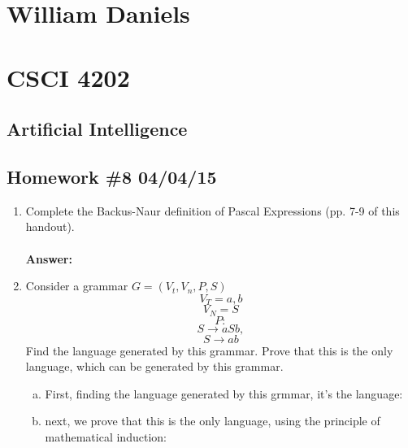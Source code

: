 \documentclass[11pt]{article}
\begin{document}
\begin{center}
\section*{William Daniels}
\section*{CSCI 4202}
\subsection*{Artificial Intelligence}
\subsection*{Homework \#8 04/04/15}
\end{center}

\vspace{.25cm}

\begin{enumerate}
\item Complete the Backus-Naur definition of Pascal Expressions (pp. 7-9 of this handout). \\\\
\textbf{Answer: } 
\item Consider a grammar $G = (V_t, V_n, P, S)$\\
$$V_T = {a, b}$$
$$V_N = S$$
$$P: $$
$$S \rightarrow aSb, $$
$$S \rightarrow ab$$
Find the language generated by this grammar. Prove that this is the only language, which can be generated by this grammar. \\
\begin{enumerate}[(a)]
\item First, finding the language generated by this grmmar, it's the language: 
\item next, we prove that this is the only language, using the principle of mathematical induction: 
\end{enumerate}
\end{enumerate}
\end{document}
